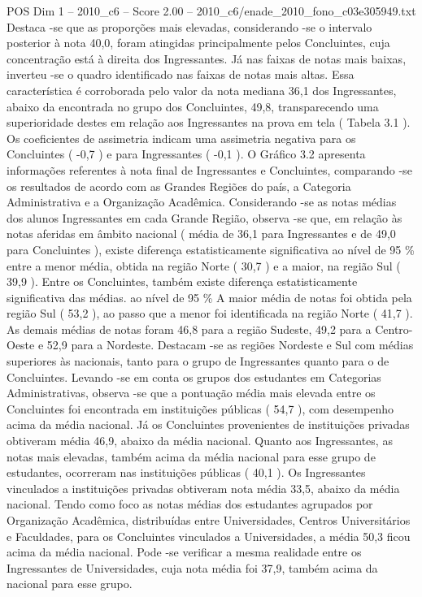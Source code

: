 \begin{textsample}{POS Dim 1 – 2010\_c6 – Score 2.00 – 2010\_c6/enade\_2010\_fono\_c03e305949.txt}
Destaca -se que as proporções mais elevadas, considerando -se o intervalo posterior à nota 40,0, foram atingidas principalmente pelos Concluintes, cuja concentração está à direita dos Ingressantes.
Já nas faixas de notas mais baixas, inverteu -se o quadro identificado nas faixas de notas mais altas.
Essa característica é corroborada pelo valor da nota mediana 36,1 dos Ingressantes, abaixo da encontrada no grupo dos Concluintes, 49,8, transparecendo uma superioridade destes em relação aos Ingressantes na prova em tela ( Tabela 3.1 ).
Os coeficientes de assimetria indicam uma assimetria negativa para os Concluintes ( -0,7 ) e para Ingressantes ( -0,1 ).
O Gráfico 3.2 apresenta informações referentes à nota final de Ingressantes e Concluintes, comparando -se os resultados de acordo com as Grandes Regiões do país, a Categoria Administrativa e a Organização Acadêmica.
Considerando -se as notas médias dos alunos Ingressantes em cada Grande Região, observa -se que, em relação às notas aferidas em âmbito nacional ( média de 36,1 para Ingressantes e de 49,0 para Concluintes ), existe diferença estatisticamente significativa ao nível de 95 \% entre a menor média, obtida na região Norte ( 30,7 ) e a maior, na região Sul ( 39,9 ).
Entre os Concluintes, também existe diferença estatisticamente significativa das médias. ao nível de 95 \% A maior média de notas foi obtida pela região Sul ( 53,2 ), ao passo que a menor foi identificada na região Norte ( 41,7 ).
As demais médias de notas foram 46,8 para a região Sudeste, 49,2 para a Centro-Oeste e 52,9 para a Nordeste.
Destacam -se as regiões Nordeste e Sul com médias superiores às nacionais, tanto para o grupo de Ingressantes quanto para o de Concluintes.
Levando -se em conta os grupos dos estudantes em Categorias Administrativas, observa -se que a pontuação média mais elevada entre os Concluintes foi encontrada em instituições públicas ( 54,7 ), com desempenho acima da média nacional.
Já os Concluintes provenientes de instituições privadas obtiveram média 46,9, abaixo da média nacional.
Quanto aos Ingressantes, as notas mais elevadas, também acima da média nacional para esse grupo de estudantes, ocorreram nas instituições públicas ( 40,1 ).
Os Ingressantes vinculados a instituições privadas obtiveram nota média 33,5, abaixo da média nacional.
Tendo como foco as notas médias dos estudantes agrupados por Organização Acadêmica, distribuídas entre Universidades, Centros Universitários e Faculdades, para os Concluintes vinculados a Universidades, a média 50,3 ficou acima da média nacional.
Pode -se verificar a mesma realidade entre os Ingressantes de Universidades, cuja nota média foi 37,9, também acima da nacional para esse grupo.

\end{textsample}
